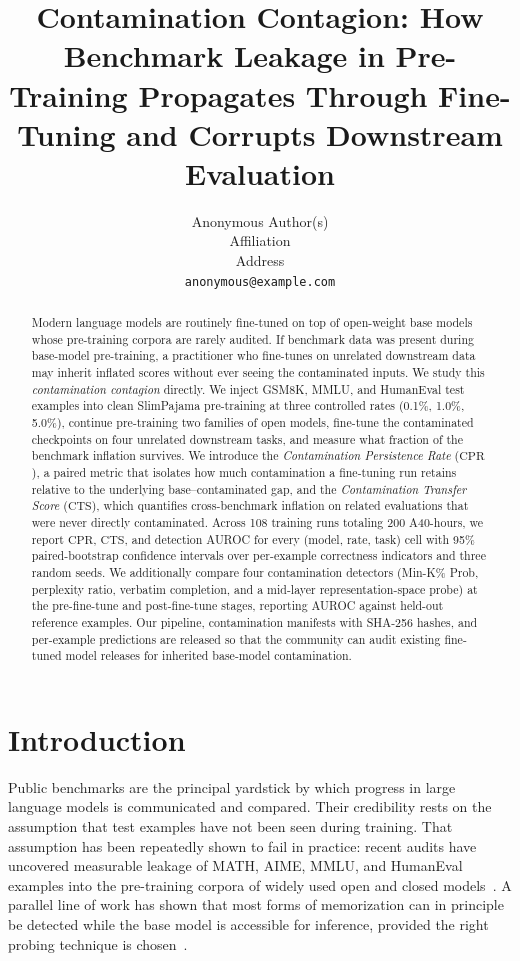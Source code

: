 \documentclass{article}
\title{Contamination Contagion: How Benchmark Leakage in Pre-Training Propagates Through Fine-Tuning and Corrupts Downstream Evaluation}
\author{%
  Anonymous Author(s) \\
  Affiliation \\
  Address \\
  \texttt{anonymous@example.com}%
}
\newcommand{\cpr}{\ensuremath{\mathrm{CPR}}}
\newcommand{\cts}{\ensuremath{\mathrm{CTS}}}
\newcommand{\resnum}[1]{#1}
\begin{document}
\maketitle

\begin{abstract}
Modern language models are routinely fine-tuned on top of open-weight base models whose pre-training corpora are rarely audited. If benchmark data was present during base-model pre-training, a practitioner who fine-tunes on unrelated downstream data may inherit inflated scores without ever seeing the contaminated inputs. We study this \emph{contamination contagion} directly. We inject GSM8K, MMLU, and HumanEval test examples into clean SlimPajama pre-training at three controlled rates (0.1\%, 1.0\%, 5.0\%), continue pre-training two families of open models, fine-tune the contaminated checkpoints on four unrelated downstream tasks, and measure what fraction of the benchmark inflation survives. We introduce the \emph{Contamination Persistence Rate} (\cpr), a paired metric that isolates how much contamination a fine-tuning run retains relative to the underlying base--contaminated gap, and the \emph{Contamination Transfer Score} (\cts), which quantifies cross-benchmark inflation on related evaluations that were never directly contaminated. Across \resnum{108} training runs totaling \resnum{200} A40-hours, we report \cpr, \cts, and detection AUROC for every (model, rate, task) cell with 95\% paired-bootstrap confidence intervals over per-example correctness indicators and three random seeds. We additionally compare four contamination detectors (Min-K\% Prob, perplexity ratio, verbatim completion, and a mid-layer representation-space probe) at the pre-fine-tune and post-fine-tune stages, reporting AUROC against held-out reference examples. Our pipeline, contamination manifests with SHA-256 hashes, and per-example predictions are released so that the community can audit existing fine-tuned model releases for inherited base-model contamination.
\end{abstract}

\section{Introduction}
\label{sec:intro}

Public benchmarks are the principal yardstick by which progress in large language models is communicated and compared. Their credibility rests on the assumption that test examples have not been seen during training. That assumption has been repeatedly shown to fail in practice: recent audits have uncovered measurable leakage of MATH, AIME, MMLU, and HumanEval examples into the pre-training corpora of widely used open and closed models~\citep{zhou2024benchmarking, yang2024rethinking, wu2025reasoning}. A parallel line of work has shown that most forms of memorization can in principle be detected while the base model is accessible for inference, provided the right probing technique is chosen~\citep{shi2024detecting, zhang2025minkpp, xie2024recall}.
\end{document}

